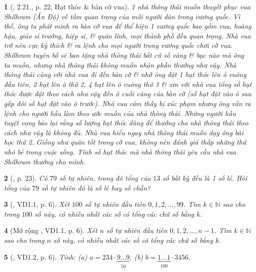 \documentclass{article}
\newtheorem{baitoan}{}
\begin{document}
\begin{baitoan}[\cite{Binh_boi_duong_Toan_6_tap_1}, 2.21., p. 22, Hạt thóc \& bàn cờ vua]
	1 nhà thông thái muốn thuyết phục vua Shilhram (Ấn Độ) về tầm quan trọng của mỗi người dân trong vương quốc. Vì thế, ông ta phát minh ra bàn cờ vua để thể hiện 1 vương quốc bao gồm vua, hoàng hậu, giáo sĩ trưởng, hiệp sĩ, \& quân lính, mọi thành phố đều quan trọng. Nhà vua trở nên cực kỳ thích \& ra lệnh cho mọi người trong vương quốc chơi cờ vua. Shilhram tuyên bố sẽ ban tặng nhà thông thái bất cứ số vàng \& bạc nào mà ông ta muốn, nhưng nhà thông thái không muốn nhận phần thưởng như vậy. Nhà thông thái cùng với nhà vua đi đến bàn cờ \& nhờ ông đặt 1 hạt thóc lên ô vuông đầu tiên, 2 hạt lên ô thứ 2, 4 hạt lên ô vuông thứ 3 \& xin với nhà vua tổng số hạt thóc được đặt theo cách như vậy đến ô cuối cùng của bàn cờ (số hạt đặt vào ô sau gấp đôi số hạt đặt vào ô trước). Nhà vua cảm thấy bị xúc phạm nhưng ông vẫn ra lệnh cho người hầu làm theo ước muốn của nhà thông thái. Những người hầu tuyệt vọng báo lại rằng số lượng hạt thóc dùng để thưởng cho nhà thông thái theo cách như vậy là không đủ. Nhà vua hiểu ngay nhà thông thái muốn dạy ông bài học thứ 2. Giống như quân tốt trong cờ vua, không nên đánh giá thấp những thứ nhỏ bé trong cuộc sống. Tính số hạt thóc mà nhà thông thái yêu cầu nhà vua Shilhram thưởng cho mình.
\end{baitoan}

\begin{baitoan}[\cite{Binh_boi_duong_Toan_6_tap_1}, p. 23]
	Có $79$ số tự nhiên, trong đó tổng của $13$ số bất kỳ đều là 1 số lẻ. Hỏi tổng của $79$ số tự nhiên đó là số lẻ hay số chẵn?
\end{baitoan}

\begin{baitoan}[\cite{TLCT_THCS_Toan_6_so_hoc}, VD1.1, p. 6]
	Xét $100$ số tự nhiên đầu tiên $0,1,2,\ldots,99$. Tìm $k\in\mathbb{N}$ sao cho trong $100$ số này, có nhiều nhất các số có tổng các chữ số bằng $k$.
\end{baitoan}

\begin{baitoan}[Mở rộng \cite{TLCT_THCS_Toan_6_so_hoc}, VD1.1, p. 6]
	Xét $n$ số tự nhiên đầu tiên $0,1,2,\ldots,n - 1$. Tìm $k\in\mathbb{N}$ sao cho trong $n$ số này, có nhiều nhất các số có tổng các chữ số bằng $k$.
\end{baitoan}

\begin{baitoan}[\cite{TLCT_THCS_Toan_6_so_hoc}, VD1.2, p. 6]
	Tính: (a) $a = 234\cdot\underbrace{9\ldots9}_{50}$. (b) $b = \underbrace{1\ldots1}_{100}\cdot3456$.
\end{baitoan}
\end{document}
